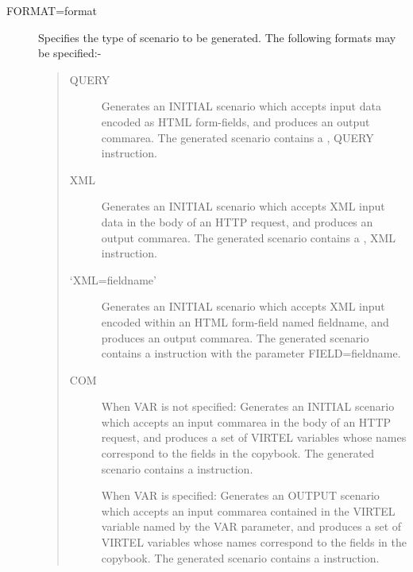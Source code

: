 \documentclass[letterpaper,10pt,english]{sphinxmanual}
\begin{document}
\begin{description}
\begin{quote}
\begin{description}
\end{description}
\end{quote}

\item[{FORMAT=format}] \leavevmode
Specifies the type of scenario to be generated. The following formats may be specified:-
\begin{quote}
\begin{description}
\item[{QUERY}] \leavevmode
Generates an INITIAL scenario which accepts input data encoded as HTML form-fields, and produces an output commarea. The generated scenario contains a {\hyperref[\detokenize{User_Guide:v457ug-map-from-input}]{}}, QUERY instruction.

\item[{XML}] \leavevmode
Generates an INITIAL scenario which accepts XML input data in the body of an HTTP request, and produces an output commarea. The generated scenario contains a {\hyperref[\detokenize{User_Guide:v457ug-map-from-input}]{}}, XML instruction.

\item[{‘XML=fieldname’}] \leavevmode
Generates an INITIAL scenario which accepts XML input encoded within an HTML form-field named fieldname, and produces an output commarea. The generated scenario contains a {\hyperref[\detokenize{User_Guide:v457ug-map-from-field}]{}} instruction with the parameter FIELD=fieldname.

\item[{COM}] \leavevmode
When VAR is not specified: Generates an INITIAL scenario which accepts an input commarea in the body of an HTTP request, and produces a set of VIRTEL variables whose names correspond to the fields in the copybook. The generated scenario contains a {\hyperref[\detokenize{User_Guide:v457ug-tovar-from-input}]{}} instruction.

When VAR is specified: Generates an OUTPUT scenario which accepts an input commarea contained in the VIRTEL variable named by the VAR parameter, and produces a set of VIRTEL variables whose names correspond to the fields in the copybook. The generated scenario contains a {\hyperref[\detokenize{User_Guide:v457ug-map-from-variable}]{}} instruction.


\end{description}
\end{quote}
\end{description}
\end{document}
